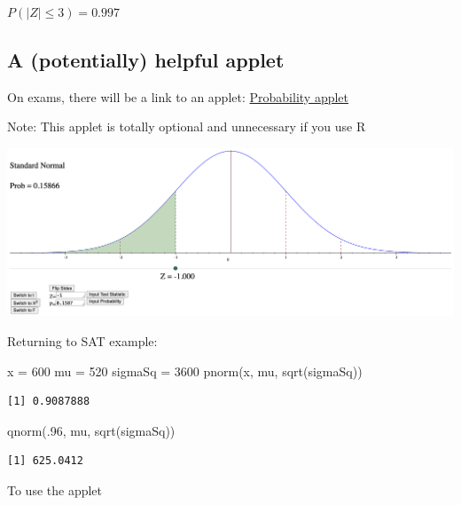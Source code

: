 \documentclass[
  letterpaper,
  DIV=11,
  numbers=noendperiod]{scrartcl}
\newenvironment{Shaded}{\begin{snugshade}}{\end{snugshade}}
\newcommand{\DecValTok}[1]{\textcolor[rgb]{0.68,0.00,0.00}{#1}}
\newcommand{\FunctionTok}[1]{\textcolor[rgb]{0.28,0.35,0.67}{#1}}
\newcommand{\NormalTok}[1]{\textcolor[rgb]{0.00,0.23,0.31}{#1}}
\newcommand{\OtherTok}[1]{\textcolor[rgb]{0.00,0.23,0.31}{#1}}
\begin{document}
{\(P( |Z| \leq 3) = 0.997\)}

\subsection{A (potentially) helpful
applet}\label{a-potentially-helpful-applet}

On exams, there will be a link to an applet:
\href{https://people.tamu.edu/~scottcrawford/ftable.html}{Probability
applet}

{Note: This applet is totally optional and unnecessary if you use R}

\includegraphics[width=7.29167in,height=\textheight,keepaspectratio]{figures/appletScott.png}

Returning to SAT example:

\begin{Shaded}
\begin{Highlighting}[]
\NormalTok{x       }\OtherTok{=} \DecValTok{600}
\NormalTok{mu      }\OtherTok{=} \DecValTok{520}
\NormalTok{sigmaSq }\OtherTok{=} \DecValTok{3600}
\FunctionTok{pnorm}\NormalTok{(x, mu, }\FunctionTok{sqrt}\NormalTok{(sigmaSq))}
\end{Highlighting}
\end{Shaded}

\begin{verbatim}
[1] 0.9087888
\end{verbatim}

\begin{Shaded}
\begin{Highlighting}[]
\FunctionTok{qnorm}\NormalTok{(.}\DecValTok{96}\NormalTok{, mu, }\FunctionTok{sqrt}\NormalTok{(sigmaSq))}
\end{Highlighting}
\end{Shaded}

\begin{verbatim}
[1] 625.0412
\end{verbatim}

To use the applet
\end{document}
